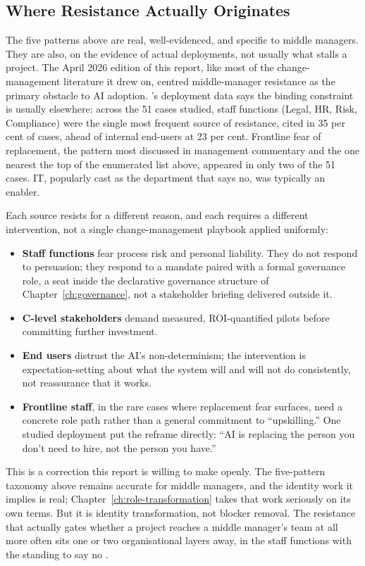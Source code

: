 \subsection{Where Resistance Actually Originates}

The five patterns above are real, well-evidenced, and specific to middle managers. They are also, on the evidence of actual deployments, not usually what stalls a project. The April 2026 edition of this report, like most of the change-management literature it drew on, centred middle-manager resistance as the primary obstacle to AI adoption. \textcite{Pereira2026Playbook}'s deployment data says the binding constraint is usually elsewhere: across the 51 cases studied, staff functions (Legal, HR, Risk, Compliance) were the single most frequent source of resistance, cited in 35 per cent of cases, ahead of internal end-users at 23 per cent. Frontline fear of replacement, the pattern most discussed in management commentary and the one nearest the top of the enumerated list above, appeared in only two of the 51 cases. IT, popularly cast as the department that says no, was typically an enabler.

Each source resists for a different reason, and each requires a different intervention, not a single change-management playbook applied uniformly:

\begin{itemize}
  \item \textbf{Staff functions} fear process risk and personal liability. They do not respond to persuasion; they respond to a mandate paired with a formal governance role, a seat inside the declarative governance structure of Chapter~\ref{ch:governance}, not a stakeholder briefing delivered outside it.
  \item \textbf{C-level stakeholders} demand measured, ROI-quantified pilots before committing further investment.
  \item \textbf{End users} distrust the AI's non-determinism; the intervention is expectation-setting about what the system will and will not do consistently, not reassurance that it works.
  \item \textbf{Frontline staff}, in the rare cases where replacement fear surfaces, need a concrete role path rather than a general commitment to ``upskilling.'' One studied deployment put the reframe directly: ``AI is replacing the person you don't need to hire, not the person you have.''
\end{itemize}

This is a correction this report is willing to make openly. The five-pattern taxonomy above remains accurate for middle managers, and the identity work it implies is real; Chapter~\ref{ch:role-transformation} takes that work seriously on its own terms. But it is identity transformation, not blocker removal. The resistance that actually gates whether a project reaches a middle manager's team at all more often sits one or two organisational layers away, in the staff functions with the standing to say no \parencite{Pereira2026Playbook}.

